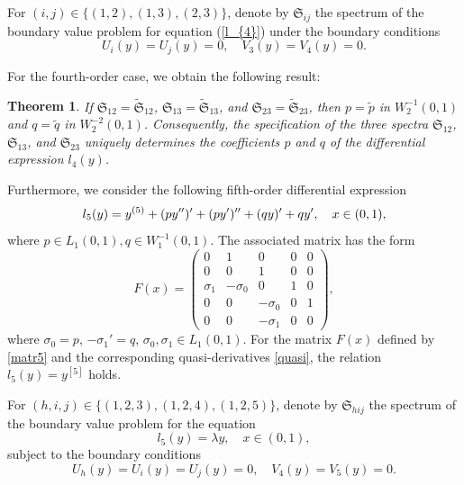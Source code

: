 \documentclass[reqno,12pt,centertags]{amsart}
\numberwithin{equation}{section}
\newtheorem{theorem}{Theorem}[section]
\theoremstyle{definition}
\begin{document}
For $(i,j)\in \{(1,2), (1,3), (2,3)\}$, denote by $\mathfrak{S}_{ij}$ the spectrum of the boundary value problem for equation (\ref{l_{4}}) under the boundary conditions
	\begin{equation*}
		U_{i}(y)=U_{j}(y)=0, \quad V_{3}(y)=V_{4}(y)=0.
	\end{equation*}
	
	For the fourth-order case, we obtain the following result:
	
	\begin{theorem}\label{thm:main}
		If $\mathfrak{S}_{12}=\tilde{\mathfrak{S}}_{12}$, $\mathfrak{S}_{13}=\tilde{\mathfrak{S}}_{13}$, and $\mathfrak{S}_{23}=\tilde{\mathfrak{S}}_{23}$, then $p=\tilde{p}$ in $W_2^{-1}(0,1)$ and $q=\tilde{q}$ in $W_2^{-2}(0,1)$. Consequently, the specification of the three spectra $\mathfrak{S}_{12}$, $\mathfrak{S}_{13}$, and $\mathfrak{S}_{23}$ uniquely determines the coefficients $p$ and $q$ of the differential expression $l_{4}(y)$.
	\end{theorem}
	
Furthermore, we consider the following fifth-order differential expression
\begin{equation} \label{l_{5}}
l_{5}(y)=y^{(5)}+(py'')'+(py')''+(qy)'+qy', \quad x\in (0,1),
\end{equation}
where $p \in L_1(0,1), q \in W_{1}^{-1}(0, 1)$. The associated matrix has the form
	\begin{equation}\label{matr5}
		F(x)=\begin{pmatrix} 0 & 1 & 0 & 0 & 0\\ 0 & 0 & 1 & 0 & 0\\ \sigma_{1} & -\sigma_{0} & 0 & 1 & 0 \\ 0 & 0 & -\sigma_{0} & 0 & 1 \\ 0 & 0 & -\sigma_{1} & 0 & 0\end{pmatrix},
	\end{equation}
	where $\sigma_{0}=p$, $-\sigma_{1}'=q$, $\sigma_{0}, \sigma_{1} \in L_1(0,1)$.
	For the matrix $F(x)$ defined by \eqref{matr5} and the corresponding quasi-derivatives \eqref{quasi}, the relation $l_{5}(y)=y^{[5]}$ holds. 
	
For $(h,i,j)\in \{(1,2,3), (1,2,4), (1,2,5)\}$, denote by $\mathfrak{S}_{hij}$ the spectrum of the boundary value problem for the equation 
$$
l_{5}(y)=\lambda y, \quad x\in (0,1),
$$ 
subject to the boundary conditions
\begin{equation*}
	U_{h}(y)=U_{i}(y)=U_{j}(y)=0, \quad V_{4}(y)=V_{5}(y)=0.
\end{equation*}
\end{document}
